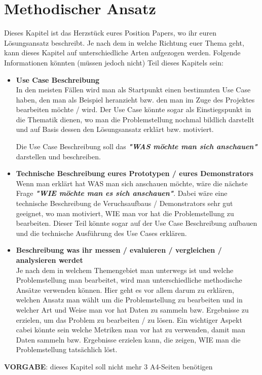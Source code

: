 
\section{Methodischer Ansatz}


Dieses Kapitel ist das Herzstück eures Position Papers, wo ihr euren Lösungsansatz beschreibt. Je nach dem in welche Richtung euer Thema geht, kann dieses Kapitel auf unterschiedliche Arten aufgezogen werden. Folgende Informationen könnten (müssen jedoch nicht) Teil dieses Kapitels sein:
\begin{itemize}
	\item\textbf{Use Case Beschreibung}\\
	In den meisten Fällen wird man als Startpunkt einen bestimmten Use Case haben, den man als Beispiel heranzieht bzw. den man im Zuge des Projektes bearbeiten möchte / wird. Der Use Case könnte sogar als Einstiegspunkt in die Thematik dienen, wo man die Problemstellung nochmal bildlich darstellt und auf Basis dessen den Lösungsansatz erklärt bzw. motiviert.
	
	Die Use Case Beschreibung soll das \textit{\textbf{"WAS möchte man sich anschauen"}} darstellen und beschreiben.\\
		
	\item\textbf{Technische Beschreibung eures Prototypen / eures Demonstrators}\\
	Wenn man erklärt hat WAS man sich anschauen möchte, wäre die nächste Frage \textit{\textbf{"WIE möchte man es sich anschauen"}}. Dabei wäre eine technische Beschreibung de Veruchsaufbaus / Demonstrators sehr gut geeignet, wo man motiviert, WIE man vor hat die Problemstellung zu bearbeiten. Dieser Teil könnte sogar auf der Use Case Beschreibung aufbauen und die technische Ausführung des Use Cases erklären. 
	
	\item\textbf{Beschreibung was ihr messen / evaluieren / vergleichen / analysieren werdet}\\
	Je nach dem in welchem Themengebiet man unterwegs ist und welche Problemstellung man bearbeitet, wird man unterschiedliche methodische Ansätze verwenden können. Hier geht es vor allem darum zu erklären, welchen Ansatz man wählt um die Problemstellung zu bearbeiten und in welcher Art und Weise man vor hat Daten zu sammeln bzw. Ergebnisse zu erzielen, um das Problem zu bearbeiten / zu lösen. Ein wichtiger Aspekt cabei könnte sein welche Metriken man vor hat zu verwenden, damit man Daten sammeln bzw. Ergebnisse erzielen kann, die zeigen, WIE man die Problemstellung tatsächlich löst.
\end{itemize}

\textbf{VORGABE}: dieses Kapitel soll nicht mehr 3 A4-Seiten benötigen

